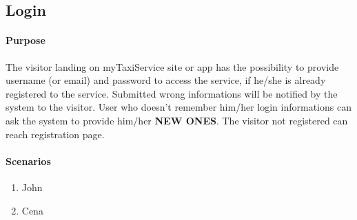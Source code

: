 \subsection{Login}
\paragraph{Purpose}The visitor landing on myTaxiService site or app has the possibility to provide username (or email) and password to access the service, if he/she is already registered to the service. Submitted wrong informations will be notified by the system to the visitor. User who doesn't remember him/her login informations can ask the system to provide him/her \textbf{NEW ONES}. The visitor not registered can reach registration page.

\paragraph{Scenarios}
\begin{enumerate}
	\item John 
	\item Cena
\end{enumerate}
